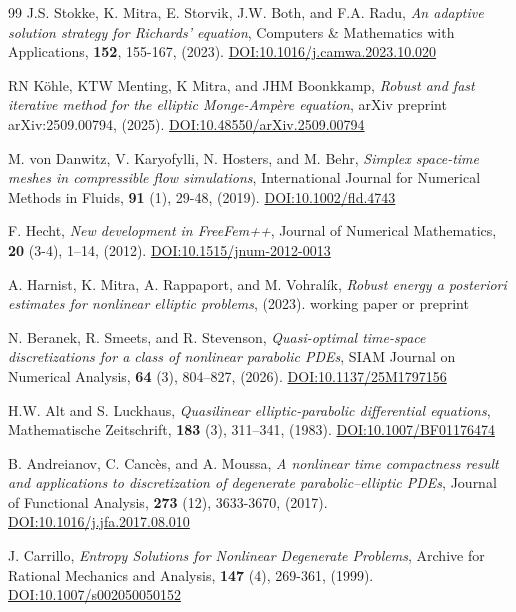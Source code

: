 \documentclass[review,11pt]{article}
\numberwithin{equation}{section}
\begin{document}
\begin{thebibliography}{99}
J.S. Stokke, K. Mitra, E. Storvik, J.W. Both, and F.A. Radu, \emph{An adaptive solution strategy for {R}ichards' equation}, Computers \& Mathematics with Applications, \textbf{152}, 155-167, (2023). \href{https://doi.org/10.1016/j.camwa.2023.10.020}
{DOI:10.1016/j.camwa.2023.10.020}

RN K{\"o}hle, KTW Menting, K Mitra, and JHM Boonkkamp, \emph{Robust and fast iterative method for the elliptic Monge-Amp\`ere equation}, arXiv preprint arXiv:2509.00794, (2025). \href{
https://doi.org/10.48550/arXiv.2509.00794}{DOI:10.48550/arXiv.2509.00794}

M. von Danwitz, V. Karyofylli, N. Hosters, and M. Behr, \emph{Simplex space-time meshes in compressible flow simulations}, International Journal for Numerical Methods in Fluids, \textbf{91} (1), 29-48, (2019). \href{https://doi.org/10.1002/fld.4743}{DOI:10.1002/fld.4743}

F. Hecht, \emph{New development in {FreeFem++}}, Journal of Numerical Mathematics, \textbf{20} (3-4), 1--14, (2012). \href{https://doi.org/10.1515/jnum-2012-0013}
{DOI:10.1515/jnum-2012-0013}

A. Harnist, K. Mitra, A. Rappaport, and M. Vohral{\'i}k, \emph{Robust energy a posteriori estimates for nonlinear elliptic problems}, (2023). working paper or preprint

N. Beranek, R. Smeets, and R. Stevenson, \emph{Quasi-optimal time-space discretizations for a class of nonlinear parabolic {PDEs}}, SIAM Journal on Numerical Analysis, \textbf{64} (3), 804--827, (2026). \href{https://doi.org/10.1137/25M1797156}{DOI:10.1137/25M1797156}

H.W. Alt and S. Luckhaus, \emph{Quasilinear elliptic-parabolic differential equations}, Mathematische Zeitschrift, \textbf{183} (3), 311--341, (1983). \href{https://doi.org/10.1007/BF01176474}{DOI:10.1007/BF01176474}

B. Andreianov, C. Canc{\`e}s, and A. Moussa, \emph{A nonlinear time compactness result and applications to discretization of degenerate parabolic--elliptic PDEs}, Journal of Functional Analysis, \textbf{273} (12), 3633-3670, (2017). \href{https://doi.org/10.1016/j.jfa.2017.08.010}
{DOI:10.1016/j.jfa.2017.08.010}


J. Carrillo, \emph{Entropy Solutions for Nonlinear Degenerate Problems}, Archive for Rational Mechanics and Analysis, \textbf{147} (4), 269-361, (1999). \href{https://doi.org/10.1007/s002050050152}
{DOI:10.1007/s002050050152}


\end{thebibliography}
\end{document}
